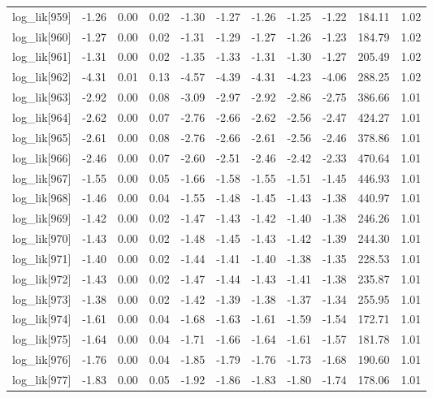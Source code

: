 \begin{table}[ht]
\begin{tabular}{rrrrrrrrrrr}
  log\_lik[959] & -1.26 & 0.00 & 0.02 & -1.30 & -1.27 & -1.26 & -1.25 & -1.22 & 184.11 & 1.02 \\ 
  log\_lik[960] & -1.27 & 0.00 & 0.02 & -1.31 & -1.29 & -1.27 & -1.26 & -1.23 & 184.79 & 1.02 \\ 
  log\_lik[961] & -1.31 & 0.00 & 0.02 & -1.35 & -1.33 & -1.31 & -1.30 & -1.27 & 205.49 & 1.02 \\ 
  log\_lik[962] & -4.31 & 0.01 & 0.13 & -4.57 & -4.39 & -4.31 & -4.23 & -4.06 & 288.25 & 1.02 \\ 
  log\_lik[963] & -2.92 & 0.00 & 0.08 & -3.09 & -2.97 & -2.92 & -2.86 & -2.75 & 386.66 & 1.01 \\ 
  log\_lik[964] & -2.62 & 0.00 & 0.07 & -2.76 & -2.66 & -2.62 & -2.56 & -2.47 & 424.27 & 1.01 \\ 
  log\_lik[965] & -2.61 & 0.00 & 0.08 & -2.76 & -2.66 & -2.61 & -2.56 & -2.46 & 378.86 & 1.01 \\ 
  log\_lik[966] & -2.46 & 0.00 & 0.07 & -2.60 & -2.51 & -2.46 & -2.42 & -2.33 & 470.64 & 1.01 \\ 
  log\_lik[967] & -1.55 & 0.00 & 0.05 & -1.66 & -1.58 & -1.55 & -1.51 & -1.45 & 446.93 & 1.01 \\ 
  log\_lik[968] & -1.46 & 0.00 & 0.04 & -1.55 & -1.48 & -1.45 & -1.43 & -1.38 & 440.97 & 1.01 \\ 
  log\_lik[969] & -1.42 & 0.00 & 0.02 & -1.47 & -1.43 & -1.42 & -1.40 & -1.38 & 246.26 & 1.01 \\ 
  log\_lik[970] & -1.43 & 0.00 & 0.02 & -1.48 & -1.45 & -1.43 & -1.42 & -1.39 & 244.30 & 1.01 \\ 
  log\_lik[971] & -1.40 & 0.00 & 0.02 & -1.44 & -1.41 & -1.40 & -1.38 & -1.35 & 228.53 & 1.01 \\ 
  log\_lik[972] & -1.43 & 0.00 & 0.02 & -1.47 & -1.44 & -1.43 & -1.41 & -1.38 & 235.87 & 1.01 \\ 
  log\_lik[973] & -1.38 & 0.00 & 0.02 & -1.42 & -1.39 & -1.38 & -1.37 & -1.34 & 255.95 & 1.01 \\ 
  log\_lik[974] & -1.61 & 0.00 & 0.04 & -1.68 & -1.63 & -1.61 & -1.59 & -1.54 & 172.71 & 1.01 \\ 
  log\_lik[975] & -1.64 & 0.00 & 0.04 & -1.71 & -1.66 & -1.64 & -1.61 & -1.57 & 181.78 & 1.01 \\ 
  log\_lik[976] & -1.76 & 0.00 & 0.04 & -1.85 & -1.79 & -1.76 & -1.73 & -1.68 & 190.60 & 1.01 \\ 
  log\_lik[977] & -1.83 & 0.00 & 0.05 & -1.92 & -1.86 & -1.83 & -1.80 & -1.74 & 178.06 & 1.01 \\ 

\end{tabular}
\end{table}

